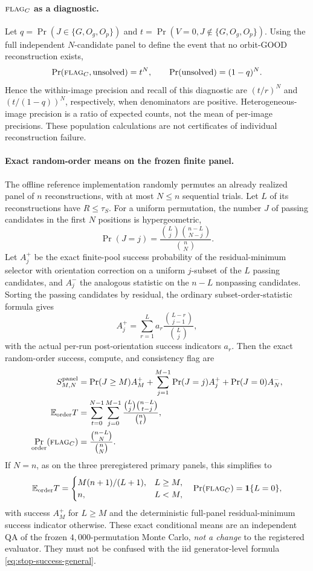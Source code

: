 \paragraph{$\textsc{flag}_C$ as a diagnostic.}
Let $q=\Pr(J\in\{G,O_g,O_p\})$ and
$t=\Pr(V=0,J\notin\{G,O_g,O_p\})$.
Using the full independent $N$-candidate panel to define the event
that no orbit-GOOD reconstruction exists,
\[
 \Pr(\textsc{flag}_C,\text{unsolved})=t^N,\qquad
 \Pr(\text{unsolved})=(1-q)^N.
\]
Hence the within-image precision and recall of this diagnostic are
$(t/r)^N$ and $(t/(1-q))^N$, respectively, when denominators are
positive. Heterogeneous-image precision is a ratio of expected counts,
not the mean of per-image precisions. These population calculations
are not certificates of individual reconstruction failure.

\paragraph{Exact random-order means on the frozen finite panel.}
The offline reference implementation randomly permutes an already
realized panel of $n$ reconstructions, with at most $N\le n$
sequential trials. Let $L$ of its reconstructions have $R\le\tau_S$.
For a uniform permutation, the number $J$ of passing candidates in
the first $N$ positions is hypergeometric,
\[
 \Pr(J=j)=\frac{\binom Lj\binom{n-L}{N-j}}{\binom nN}.
\]
Let $A_j^+$ be the exact finite-pool success probability of the
residual-minimum selector with orientation correction on a uniform
$j$-subset of the $L$ passing candidates, and $A_j^-$ the analogous
statistic on the $n-L$ nonpassing candidates. Sorting the passing
candidates by residual, the ordinary subset-order-statistic formula
gives
\[
 A_j^+=\sum_{r=1}^{L}a_r\frac{\binom{L-r}{j-1}}{\binom Lj},
\]
with the actual per-run post-orientation success indicators $a_r$.
Then the exact random-order success, compute, and consistency flag are
\begin{align}
 S^{\mathrm{panel}}_{M,N}
 &=\Pr(J\ge M)A_M^+
 +\sum_{j=1}^{M-1}\Pr(J=j)A_j^++\Pr(J=0)A_N^-,\\
 \mathbb E_{\mathrm{order}}T
 &=\sum_{t=0}^{N-1}\sum_{j=0}^{M-1}
   \frac{\binom Lj\binom{n-L}{t-j}}{\binom nt},\\
 \Pr_{\mathrm{order}}(\textsc{flag}_C)
 &=\frac{\binom{n-L}{N}}{\binom nN}.
\end{align}
If $N=n$, as on the three preregistered primary panels, this
simplifies to
\[
 \mathbb E_{\mathrm{order}}T
 =\begin{cases}M(n+1)/(L+1),&L\ge M,\\n,&L<M,\end{cases}
 \quad
 \Pr(\textsc{flag}_C)=\mathbf1\{L=0\},
\]
with success $A_M^+$ for $L\ge M$ and the deterministic full-panel
residual-minimum success indicator otherwise. These exact conditional
means are an independent QA of the frozen $4{,}000$-permutation
Monte Carlo, \emph{not a change} to the registered evaluator. They
must not be confused with the iid generator-level formula
\eqref{eq:stop-success-general}.

